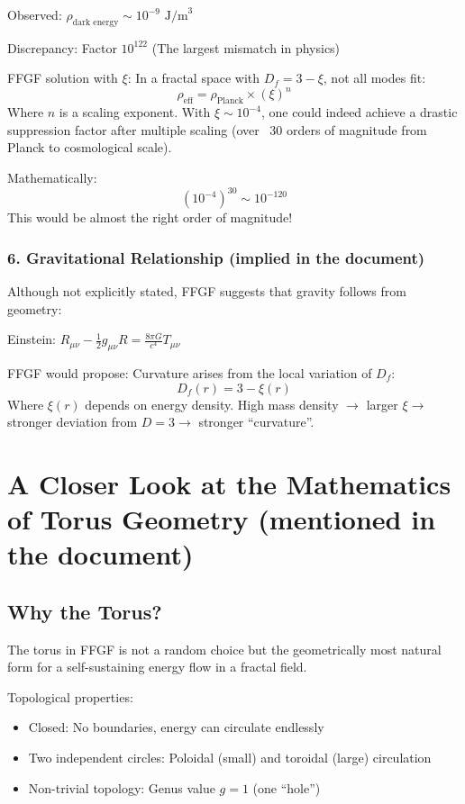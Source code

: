 	Observed: \( \rho_{\text{dark energy}} \sim 10^{-9} \text{ J/m}^3 \)
	
	Discrepancy: Factor \( 10^{122} \) (The largest mismatch in physics)
	
	FFGF solution with \( \xi \):
	In a fractal space with \( D_f = 3 - \xi \), not all modes fit:
	\[
	\rho_{\text{eff}} = \rho_{\text{Planck}} \times (\xi)^n
	\]
	Where \( n \) is a scaling exponent. With \( \xi \sim 10^{-4} \), one could indeed achieve a drastic suppression factor after multiple scaling (over ~30 orders of magnitude from Planck to cosmological scale).
	
	Mathematically:
	\[
	(10^{-4})^{30} \sim 10^{-120}
	\]
	This would be almost the right order of magnitude!
	
	\subsubsection{6. Gravitational Relationship (implied in the document)}
	Although not explicitly stated, FFGF suggests that gravity follows from geometry:
	
	Einstein: \( R_{\mu\nu} - \frac{1}{2}g_{\mu\nu}R = \frac{8\pi G}{c^4} T_{\mu\nu} \)
	
	FFGF would propose: Curvature arises from the local variation of \( D_f \):
	\[
	D_f(r) = 3 - \xi(r)
	\]
	Where \( \xi(r) \) depends on energy density. High mass density \( \rightarrow \) larger \( \xi \rightarrow \) stronger deviation from \( D=3 \rightarrow \) stronger ``curvature''.
	\section{A Closer Look at the Mathematics of Torus Geometry (mentioned in the document)}
\subsection{Why the Torus?}
The torus in FFGF is not a random choice but the geometrically most natural form for a self-sustaining energy flow in a fractal field.

Topological properties:
\begin{itemize}
	\item Closed: No boundaries, energy can circulate endlessly
	\item Two independent circles: Poloidal (small) and toroidal (large) circulation
	\item Non-trivial topology: Genus value \( g = 1 \) (one ``hole'')
\end{itemize}

